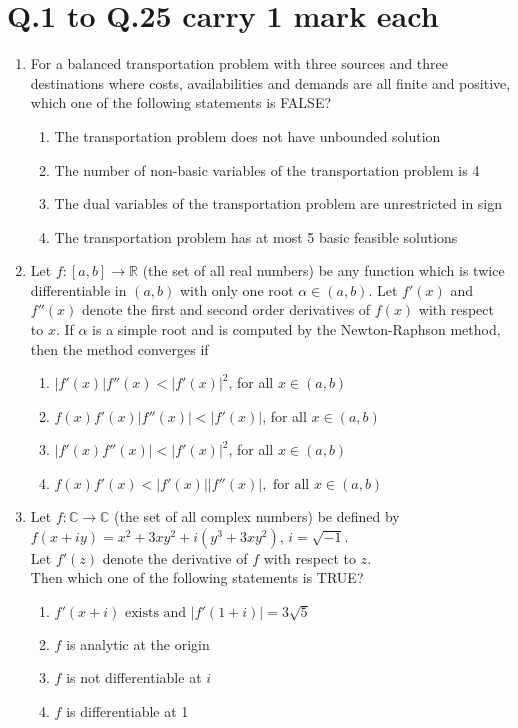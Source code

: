 \documentclass[journal,,12pt,onecolumn]{IEEEtran}
\theoremstyle{remark}
\begin{document}
    \section*{Q.1 to Q.25 carry 1 mark each}
    \begin{enumerate}
    \item For a balanced transportation problem with three sources and three destinations where costs, availabilities and demands are all finite and positive, which one of the following statements is FALSE?\\
    \begin{enumerate}
        \item The transportation problem does not have unbounded solution
        \item The number of non-basic variables of the transportation problem is 4
        \item The dual variables of the transportation problem are unrestricted in sign
        \item The transportation problem has at most 5 basic feasible solutions
    \end{enumerate}
    \bigskip

    \item Let $ f : [a,b] \to \mathbb{R} $ (the set of all real numbers) be any function which is twice differentiable in $ (a,b) $ with only one root $ \alpha \in (a,b) $. Let $ f' (x) $ and $ f''(x) $ denote the first and second order derivatives of $ f(x) $ with respect to $ x $. If $ \alpha $ is a simple root and is computed by the Newton-Raphson method, then the method converges if\\
    \begin{enumerate}
        \item $ |f' (x)| f''(x) < |f'(x)|^2 $, for all $ x \in (a,b) $
        \item $ f(x) f' (x) |f''(x)| < |f'(x)|$, for all $ x \in (a,b) $
        \item $ |f'(x) f''(x)| < |f'(x)|^2 $, for all $ x \in (a,b) $
        \item $ f(x) f' (x) < |f'(x)| |f''(x)|, \text{ for all } x \in (a,b) $
    \end{enumerate}
    \bigskip

    \item Let $ f : \mathbb{C} \to \mathbb{C} $ (the set of all complex numbers) be defined by\\
    $ f(x + iy) = x^2 + 3xy^2 + i(y^3 + 3xy^2) $, $ i = \sqrt{-1} $.\\
    Let $ f'(z) $ denote the derivative of $ f $ with respect to $ z $.\\
    Then which one of the following statements is TRUE?\\
    \begin{enumerate}
        \item $ f'(x + i) \text{ exists and } |f'(1+i)| = 3\sqrt{5} $
        \item $ f $ is analytic at the origin
        \item $ f $ is not differentiable at $ i $
        \item $ f $ is differentiable at 1
    \end{enumerate}
    \bigskip
\end{enumerate}
\end{document}
